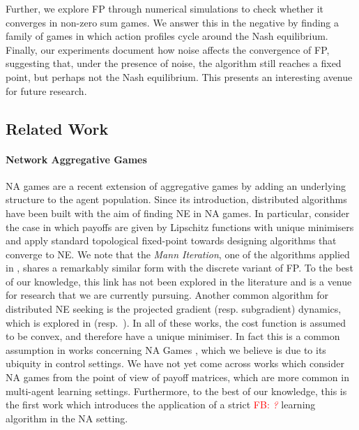 \documentclass{article}
\theoremstyle{definition}
\newcommand{\fb}[1]{\textcolor{red}{FB: \textit{#1}}}
\begin{document}
  Further, we explore FP through numerical simulations to check
whether it converges in non-zero sum games. We answer this in the
negative by finding a family of games in which action profiles cycle
around the Nash equilibrium. Finally, our experiments document how
noise affects the convergence of FP, suggesting
that,
under the presence of noise, the algorithm still reaches a fixed
point, but perhaps not the Nash equilibrium. This presents an
interesting avenue for future research.

\subsection{Related Work}

\paragraph{Network Aggregative Games}

NA games are a recent \cite{Parise2015} extension of
aggregative games by adding an underlying structure to
the agent population. Since its introduction, distributed algorithms have
been built with the aim of finding NE in NA games. In particular,
\cite{Parise2015,Parise2020} consider the case in which payoffs are
given by Lipschitz functions with unique minimisers and apply standard
topological fixed-point towards designing algorithms that
converge to NE. We note that the \emph{Mann Iteration}, one of the
algorithms applied in \cite{Parise2020}, shares a remarkably similar
form with the discrete variant of FP. To the best of our knowledge,
this link has not been explored in the literature and is a venue for
research that we are currently pursuing. Another common algorithm for
distributed NE seeking is the projected gradient (resp. subgradient)
dynamics, which is explored in \cite{Zhang2020}
(resp.~\cite{Shokri2020, Shokri2021}). In all of these works, the cost
function is assumed to be convex, and therefore have a unique
minimiser. In fact this is a common assumption in works concerning NA
Games \cite{Zhu2021, Lei2020}, which we believe is due to its ubiquity
in control settings. We have not yet come across works which consider
NA games from the point of view of payoff matrices, which are more
common in multi-agent learning settings.  Furthermore, to the best of
our knowledge, this is the first work which introduces the application
of a strict \fb{?} learning algorithm in the NA setting.
\end{document}

